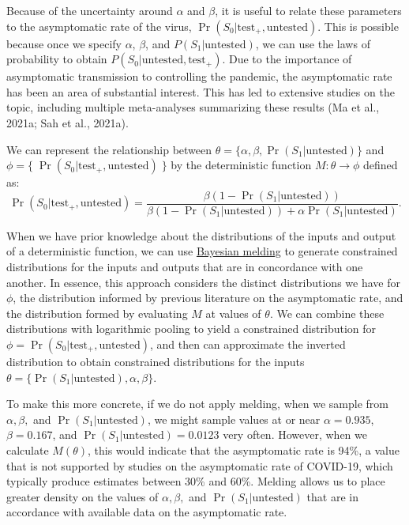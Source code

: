 \documentclass[12pt,twoside]{smiththesis}
\begin{document}
Because of the uncertainty around \(\alpha\) and \(\beta\), it is useful to relate these parameters to the asymptomatic rate of the virus, \(\Pr(S_0|\text{test}_+, \text{untested})\). This is possible because once we specify \(\alpha\), \(\beta\), and \(P(S_1|\text{untested})\), we can use the laws of probability to obtain \(P(S_0|\text{untested},\text{test}_+)\). Due to the importance of asymptomatic transmission to controlling the pandemic, the asymptomatic rate has been an area of substantial interest. This has led to extensive studies on the topic, including multiple meta-analyses summarizing these results (Ma et al., 2021a; Sah et al., 2021a).

We can represent the relationship between \(\theta = \{ \alpha, \beta, \Pr(S_1|\text{untested})\}\) and \(\phi = \{\; \Pr(S_0|\text{test}_+, \text{untested})\;\}\) by the deterministic function
\(M: \theta \to \phi\) defined as:
\[\Pr(S_0|\text{test}_+, \text{untested}) = \dfrac{\beta(1 - \Pr(S_1|\text{untested}))}{\beta(1-\Pr(S_1|\text{untested})) + \alpha \Pr(S_1|\text{untested})}.\]

When we have prior knowledge about the distributions of the inputs and output of a deterministic function, we can use \protect\hyperlink{meld}{Bayesian melding} to generate constrained distributions for the inputs and outputs that are in concordance with one another. In essence, this approach considers the distinct distributions we have for \(\phi\), the distribution informed by previous literature on the asymptomatic rate, and the distribution formed by evaluating \(M\) at values of \(\theta\). We can combine these distributions with logarithmic pooling to yield a constrained distribution for \(\phi=\Pr(S_0|\text{test}_+, \text{untested})\), and then can approximate the inverted distribution to obtain constrained distributions for the inputs \(\theta = \{\Pr(S_1|\text{untested}), \alpha, \beta \}\).

To make this more concrete, if we do not apply melding, when we sample from \(\alpha, \beta,\) and \(\Pr(S_1|\text{untested})\), we might sample values at or near \(\alpha = 0.935\), \(\beta = 0.167\), and \(\Pr(S_1|\text{untested} ) = 0.0123\) very often. However, when we calculate \(M(\theta)\), this would indicate that the asymptomatic rate is 94\%, a value that is not supported by studies on the asymptomatic rate of COVID-19, which typically produce estimates between 30\% and 60\%. Melding allows us to place greater density on the values of \(\alpha, \beta,\) and \(\Pr(S_1|\text{untested})\) that are in accordance with available data on the asymptomatic rate.
\end{document}
